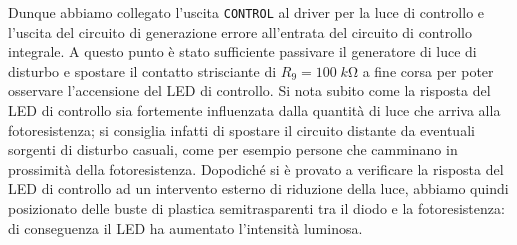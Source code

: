 \documentclass[10pt, a4paper, italian]{article}
\begin{document}
Dunque abbiamo collegato l'uscita \verb+CONTROL+ al driver per la luce di
controllo e l'uscita del circuito di generazione errore all'entrata del
circuito di controllo integrale.
A questo punto è stato sufficiente passivare il generatore di luce di
disturbo e spostare il contatto strisciante di $R_9 = 100 \; \si{k\ohm}$ a
fine corsa per poter osservare l'accensione del LED di controllo.
Si nota subito come la risposta del LED di controllo sia fortemente influenzata dalla quantità di luce che arriva alla fotoresistenza; si consiglia infatti di spostare il circuito distante da eventuali sorgenti di disturbo casuali, come per esempio persone che camminano in prossimità della fotoresistenza. 
Dopodiché si è provato a verificare la risposta del LED di controllo ad un intervento esterno di riduzione della luce, abbiamo quindi posizionato delle buste di plastica semitrasparenti tra il diodo e la fotoresistenza: di conseguenza il LED ha aumentato l'intensità luminosa.
\end{document}
